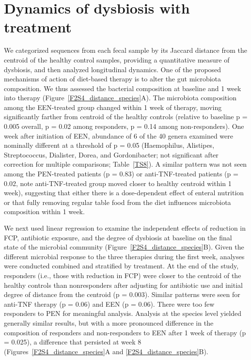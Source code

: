 \section{ Dynamics of dysbiosis with treatment }
We categorized sequences from each fecal sample by its Jaccard distance from the centroid of the healthy control samples, providing a quantitative measure of dysbiosis, and then analyzed longitudinal dynamics. One of the proposed mechanisms of action of diet-based therapy is to alter the gut microbiota composition. We thus assessed the bacterial composition at baseline and 1 week into therapy (Figure~\ref{F2S4_distance_species}A). The microbiota composition among the EEN-treated group changed within 1 week of therapy, moving significantly farther from centroid of the healthy controls (relative to baseline p = 0.005 overall, p = 0.02 among responders, p = 0.14 among non-responders). One week after initiation of EEN, abundance of 6 of the 40 genera examined were nominally different at a threshold of p = 0.05 (Haemophilus, Alistipes, Streptococcus, Dialister, Dorea, and Gordonibacter; not significant after correction for multiple comparisons; Table~\ref{TS8}). A similar pattern was not seen among the PEN-treated patients (p = 0.83) or anti-TNF-treated patients (p = 0.02, note anti-TNF-treated group moved closer to healthy centroid within 1 week), suggesting that either there is a dose-dependent effect of enteral nutrition or that fully removing regular table food from the diet influences microbiota composition within 1 week. 

We next used linear regression to examine the independent effects of reduction in FCP, antibiotic exposure, and the degree of dysbiosis at baseline on the final state of the microbial community (Figure~\ref{F2S4_distance_species}B). Given the different microbial response to the three therapies during the first week, analyses were conducted combined and stratified by treatment. At the end of the study, responders (i.e., those with reduction in FCP) were closer to the centroid of the healthy controls than nonresponders after adjusting for antibiotic use and initial degree of distance from the centroid (p = 0.003). Similar patterns were seen for anti-TNF therapy (p = 0.06) and EEN (p = 0.06). There were too few responders to PEN for meaningful analysis. Analysis at the species level yielded generally similar results, but with a more pronounced difference in the composition of responders and non-responders to EEN after 1 week of therapy (p = 0.025), a difference that persisted at week 8 (Figures~\ref{F2S4_distance_species}A and \ref{F2S4_distance_species}B). 

